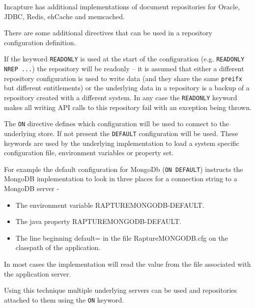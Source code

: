 Incapture has additional implementations of document repositories for Oracle, JDBC, Redis, ehCache and memcached.

There are some additional directives that can be used in a repository configuration definition.

If the keyword \verb+READONLY+ is used at the start of the configuration (e.g. \verb+READONLY NREP ...+) the repository will
be readonly -- it is assumed that either a different repository configuration is used to write data (and they
share the same \verb+preifx+ but different entitlements) or the underlying data in a repository is a backup of
a repository created with a different system. In any case the \verb+READONLY+ keyword makes all writing API calls to
this repository fail with an exception being thrown.

The \verb+ON+ directive defines which configuration will be used to connect to the underlying store. If
not present the \verb+DEFAULT+ configuration will be used. These keywords are used by the underlying
implementation to load a system specific configuration file, environment variables or property set.

For example the default configuration for MongoDb (\verb+ON DEFAULT+) instructs the MongoDB implementation
to look in three places for a connection string to a MongoDB server -

\begin{itemize}
\item{The environment variable RAPTUREMONGODB-DEFAULT.}
\item{The java property RAPTUREMONGODB-DEFAULT.}
\item{The line beginning default= in the file RaptureMONGODB.cfg on the classpath of the application.}
\end{itemize}

In most cases the implementation will read the value from the file associated with the application server.

Using this technique multiple underlying servers can be used and repositories attached to them using the
\verb+ON+ keyword.
